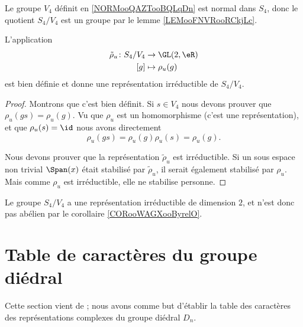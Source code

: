 Le groupe \( V_4\) définit en \ref{NORMooQAZTooBQLqDn} est normal dans \( S_4\), donc le quotient \( S_4/V_4\) est un groupe par le lemme \ref{LEMooFNVRooRCkjLc}.

\begin{lemma}
    L'application
    \begin{equation}
        \begin{aligned}
            \tilde \rho_u\colon S_4/V_4&\to \GL(2,\eR) \\
            [g]&\mapsto \rho_u(g) 
        \end{aligned}
    \end{equation}
    est bien définie et donne une représentation irréductible de \( S_4/V_4\).
\end{lemma}

\begin{proof}
    Montrons que c'est bien définit. Si \( s\in V_4\) nous devons prouver que \( \rho_u(gs)=\rho_u(g)\). Vu que \( \rho_u\) est un homomorphisme (c'est une représentation), et que \( \rho_u(s)=\id\) nous avons directement
    \begin{equation}
        \rho_u(gs)=\rho_u(g)\rho_u(s)=\rho_u(g).
    \end{equation}
    
    Nous devons prouver que la représentation \( \tilde \rho_u\) est irréductible. Si un sous espace non trivial \( \Span(x)\) était stabilisé par \( \tilde \rho_u\), il serait également stabilisé par \( \rho_u\). Mais comme \( \rho_u\) est irréductible, elle ne stabilise personne.
\end{proof}

Le groupe \( S_4/V_4\) a une représentation irréductible de dimension \( 2\), et n'est donc pas abélien par le corollaire \ref{CORooWAGXooByrelO}.

\section{Table de caractères du groupe diédral}
\label{SecWMzheKf}
Cette section vient de \cite{KXjFWKA}; nous avons comme but d'établir la table des caractères des représentations complexes du groupe diédral \( D_n\).

